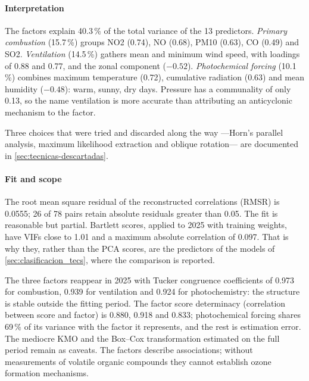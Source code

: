 \paragraph{Interpretation}
The factors explain 40.3\,\% of the total variance of the 13 predictors.
\emph{Primary combustion} (15.7\,\%) groups NO2 (0.74), NO (0.68), PM10
(0.63), CO (0.49) and SO2. \emph{Ventilation} (14.5\,\%) gathers mean and
minimum wind speed, with loadings of 0.88 and 0.77, and the zonal component
($-0.52$). \emph{Photochemical forcing} (10.1\,\%) combines maximum
temperature (0.72), cumulative radiation (0.63) and mean humidity ($-0.48$):
warm, sunny, dry days. Pressure has a communality of only 0.13, so the name
ventilation is more accurate than attributing an anticyclonic mechanism to
the factor.

Three choices that were tried and discarded along the way ---Horn's parallel
analysis, maximum likelihood extraction and oblique rotation--- are
documented in \cref{sec:tecnicas-descartadas}.

\paragraph{Fit and scope}
The root mean square residual of the reconstructed correlations (RMSR) is
0.0555; 26 of 78 pairs retain absolute residuals greater than 0.05. The fit
is reasonable but partial. Bartlett scores, applied to 2025 with training
weights, have VIFs close to 1.01 and a maximum absolute correlation of 0.097.
That is why they, rather than the PCA scores, are the predictors of the
models of \cref{sec:clasificacion_tecs}, where the comparison is reported.

The three factors reappear in 2025 with Tucker congruence coefficients of
0.973 for combustion, 0.939 for ventilation and 0.924 for photochemistry: the
structure is stable outside the fitting period. The factor score determinacy
(correlation between score and factor) is 0.880, 0.918 and 0.833;
photochemical forcing shares 69\,\% of its variance with the factor it
represents, and the rest is estimation error. The mediocre KMO and the
Box--Cox transformation estimated on the full period remain as caveats. The
factors describe associations; without measurements of volatile organic
compounds they cannot establish ozone formation mechanisms.
